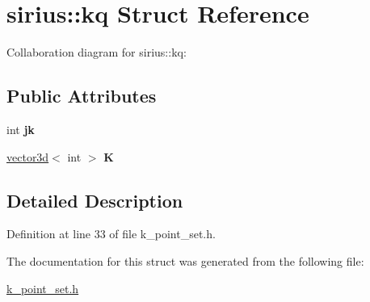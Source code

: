 \hypertarget{structsirius_1_1kq}{}\section{sirius\+:\+:kq Struct Reference}
\label{structsirius_1_1kq}


Collaboration diagram for sirius\+:\+:kq\+:
\subsection*{Public Attributes}
\begin{DoxyCompactItemize}
\item 
\hypertarget{structsirius_1_1kq_ae1178f98843f458a130ef3e88067eda3}{}int {\bfseries jk}\label{structsirius_1_1kq_ae1178f98843f458a130ef3e88067eda3}

\item 
\hypertarget{structsirius_1_1kq_aadcee30826619d1539995c520bf30d82}{}\hyperlink{classgeometry3d_1_1vector3d}{vector3d}$<$ int $>$ {\bfseries K}\label{structsirius_1_1kq_aadcee30826619d1539995c520bf30d82}

\end{DoxyCompactItemize}


\subsection{Detailed Description}


Definition at line 33 of file k\+\_\+point\+\_\+set.\+h.



The documentation for this struct was generated from the following file\+:\begin{DoxyCompactItemize}
\item 
\hyperlink{k__point__set_8h}{k\+\_\+point\+\_\+set.\+h}\end{DoxyCompactItemize}
